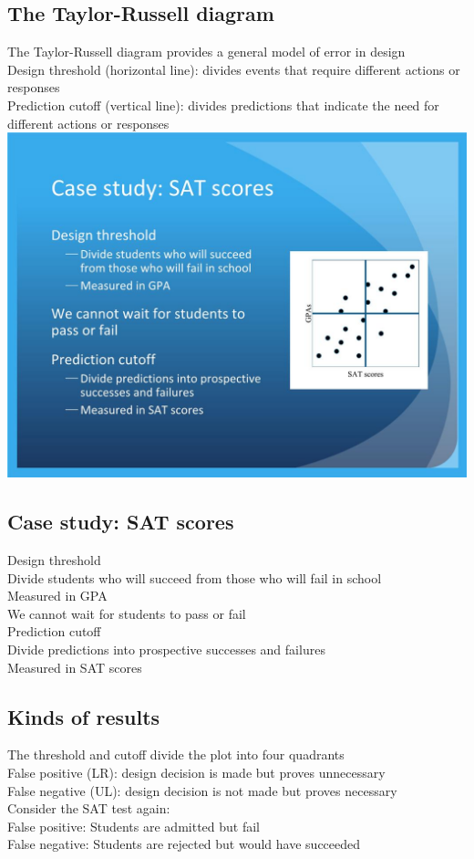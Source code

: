 \documentclass{article}
\begin{document}
\subsection*{The Taylor-Russell diagram}
\label{sub:the_taylor_russell_diagram}
The Taylor-Russell diagram provides a general model of error in design\\
Design threshold (horizontal line): divides events that require different actions or responses\\
Prediction cutoff (vertical line): divides predictions that indicate the need for different actions or responses\\
\includegraphics[scale=0.5]{russelldiagram.jpg}
\subsection*{Case study: SAT scores}
\label{sub:case_study_sat_scores}
Design threshold\\
Divide students who will succeed from those who will fail in school\\
Measured in GPA\\
We cannot wait for students to pass or fail\\
Prediction cutoff\\
Divide predictions into prospective successes and failures\\
Measured in SAT scores\\
\subsection*{Kinds of results}
\label{sub:kinds_of_results}
The threshold and cutoff divide the plot into four quadrants\\
False positive (LR): design decision is made but proves unnecessary\\
False negative (UL): design decision is not made but proves necessary\\
Consider the SAT test again:\\
False positive: Students are admitted but fail\\
False negative: Students are rejected but would have succeeded\\
\end{document}

